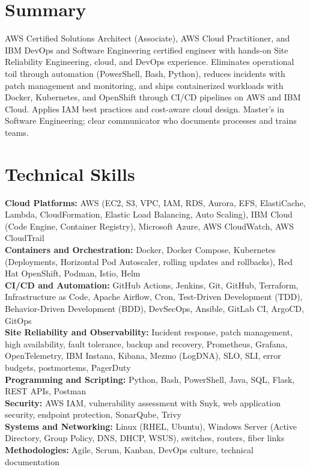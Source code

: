\documentclass[a4paper,10pt]{article}
\begin{document}

\section*{Summary}
AWS Certified Solutions Architect (Associate), AWS Cloud Practitioner, and IBM DevOps and Software Engineering certified engineer with hands-on Site Reliability Engineering, cloud, and DevOps experience. Eliminates operational toil through automation (PowerShell, Bash, Python), reduces incidents with patch management and monitoring, and ships containerized workloads with Docker, Kubernetes, and OpenShift through CI/CD pipelines on AWS and IBM Cloud. Applies IAM best practices and cost-aware cloud design. Master's in Software Engineering; clear communicator who documents processes and trains teams.

\section*{Technical Skills}
\textbf{Cloud Platforms:} AWS (EC2, S3, VPC, IAM, RDS, Aurora, EFS, ElastiCache, Lambda, CloudFormation, Elastic Load Balancing, Auto Scaling), IBM Cloud (Code Engine, Container Registry), Microsoft Azure, AWS CloudWatch, AWS CloudTrail \\
\textbf{Containers and Orchestration:} Docker, Docker Compose, Kubernetes (Deployments, Horizontal Pod Autoscaler, rolling updates and rollbacks), Red Hat OpenShift, Podman, Istio, Helm \\
\textbf{CI/CD and Automation:} GitHub Actions, Jenkins, Git, GitHub, Terraform, Infrastructure as Code, Apache Airflow, Cron, Test-Driven Development (TDD), Behavior-Driven Development (BDD), DevSecOps, Ansible, GitLab CI, ArgoCD, GitOps \\
\textbf{Site Reliability and Observability:} Incident response, patch management, high availability, fault tolerance, backup and recovery, Prometheus, Grafana, OpenTelemetry, IBM Instana, Kibana, Mezmo (LogDNA), SLO, SLI, error budgets, postmortems, PagerDuty \\
\textbf{Programming and Scripting:} Python, Bash, PowerShell, Java, SQL, Flask, REST APIs, Postman\\
\textbf{Security:} AWS IAM, vulnerability assessment with Snyk, web application security, endpoint protection, SonarQube, Trivy \\
\textbf{Systems and Networking:} Linux (RHEL, Ubuntu), Windows Server (Active Directory, Group Policy, DNS, DHCP, WSUS), switches, routers, fiber links\\
\textbf{Methodologies:} Agile, Scrum, Kanban, DevOps culture, technical documentation
\end{document}
